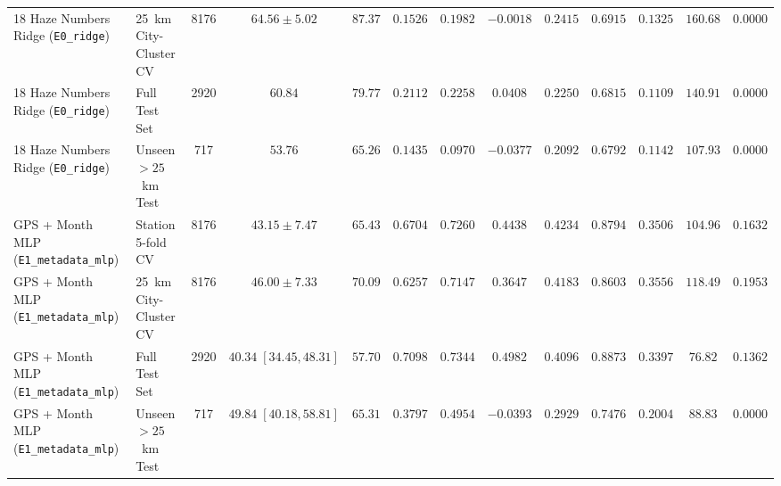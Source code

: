 \documentclass[conference]{IEEEtran}
\begin{document}
\begin{table}[t]
{\begin{tabular}{llccccccccccc}
      18 Haze Numbers Ridge (\texttt{E0\_ridge})   & 25~km City-Cluster CV     &       8176       &             $64.56 \pm 5.02$             &    $87.37$    &   $0.1526$    &   $0.1982$    &     $-0.0018$      &   $0.2415$   &             $0.6915$             &     $0.1325$     &     $160.68$     &    $0.0000$     \\
      18 Haze Numbers Ridge (\texttt{E0\_ridge})   & Full Test Set             &       2920       &                 $60.84$                  &    $79.77$    &   $0.2112$    &   $0.2258$    &      $0.0408$      &   $0.2250$   &             $0.6815$             &     $0.1109$     &     $140.91$     &    $0.0000$     \\
      18 Haze Numbers Ridge (\texttt{E0\_ridge})   & Unseen $> 25$~km Test     &       717        &                 $53.76$                  &    $65.26$    &   $0.1435$    &   $0.0970$    &     $-0.0377$      &   $0.2092$   &             $0.6792$             &     $0.1142$     &     $107.93$     &    $0.0000$     \\
      \midrule
      GPS + Month MLP (\texttt{E1\_metadata\_mlp}) & Station 5-fold CV         &       8176       &        $\mathbf{43.15 \pm 7.47}$         &    $65.43$    &   $0.6704$    &   $0.7260$    &      $0.4438$      &   $0.4234$   &             $0.8794$             &     $0.3506$     &     $104.96$     &    $0.1632$     \\
      GPS + Month MLP (\texttt{E1\_metadata\_mlp}) & 25~km City-Cluster CV     &       8176       &        $\mathbf{46.00 \pm 7.33}$         &    $70.09$    &   $0.6257$    &   $0.7147$    &      $0.3647$      &   $0.4183$   &             $0.8603$             &     $0.3556$     &     $118.49$     &    $0.1953$     \\
      GPS + Month MLP (\texttt{E1\_metadata\_mlp}) & Full Test Set             &       2920       &     $\mathbf{40.34}\;[34.45, 48.31]$     &    $57.70$    &   $0.7098$    &   $0.7344$    &      $0.4982$      &   $0.4096$   &             $0.8873$             &     $0.3397$     &     $76.82$      &    $0.1362$     \\
      GPS + Month MLP (\texttt{E1\_metadata\_mlp}) & Unseen $> 25$~km Test     &       717        &     $\mathbf{49.84}\;[40.18, 58.81]$     &    $65.31$    &   $0.3797$    &   $0.4954$    & $\mathbf{-0.0393}$ &   $0.2929$   &             $0.7476$             &     $0.2004$     &     $88.83$      &    $0.0000$     \\
      \bottomrule
    \end{tabular}%
  }
\end{table}
\end{document}
